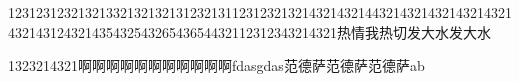 12312312321321332132132131232131123123213214321432144321432143214321432143214312432143543254326543654432112312343214321热情我热切发大水发大水


1323214321啊啊啊啊啊啊啊啊啊啊啊fdasgdas范德萨范德萨范德萨ab